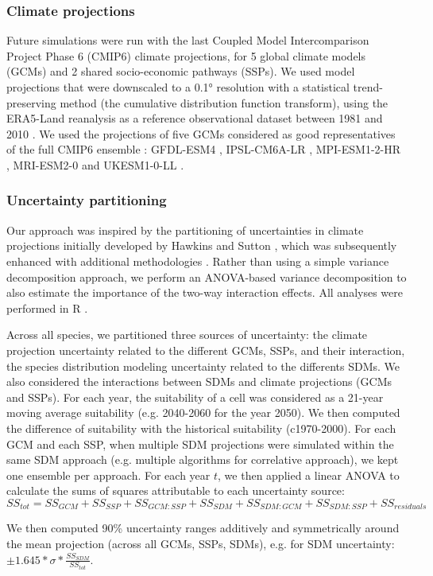 \documentclass[11pt,letter]{article}
\begin{document}
\subsubsection*{Climate projections}

Future simulations were run with the last Coupled Model Intercomparison Project Phase 6 (CMIP6) climate  projections, for 5 global climate models (GCMs) and 2 shared socio-economic pathways (SSPs). 
We used model projections that were downscaled to a 0.1° resolution with a statistical trend-preserving method (the cumulative distribution function transform), using the ERA5-Land reanalysis as a reference observational dataset between 1981 and 2010 \citep{Noel2022}. We used the projections of five GCMs considered as good representatives of the full CMIP6 ensemble \citep{Noel2022} : GFDL-ESM4 \citep{Dunne2020}, IPSL-CM6A-LR \citep{Lurton2020}, MPI-ESM1-2-HR \citep{Mueller2018}, MRI-ESM2-0 \citep{Yukimoto2019} and UKESM1-0-LL \citep{Sellar2020}.  

\subsubsection*{Uncertainty partitioning}

Our approach was inspired by the partitioning of uncertainties in climate projections initially developed by Hawkins and Sutton \citep{Hawkins2009, Hawkins2011}, which was subsequently enhanced with additional methodologies \citep{Yip2011, Lafferty2023}. Rather than using a simple variance decomposition approach, we perform an ANOVA-based variance decomposition to also estimate the importance of the two-way interaction effects. All analyses were performed in R \citep{RCT2024}.

Across all species, we partitioned three sources of uncertainty: the climate projection uncertainty related to the different GCMs, SSPs, and their interaction, the species distribution modeling uncertainty related to the differents SDMs. We also considered the interactions between SDMs and climate projections (GCMs and SSPs). For each year, the suitability of a cell was considered as a 21-year moving average suitability (e.g. 2040-2060 for the year 2050). We then computed the difference of suitability with the historical suitability (c1970-2000). For each GCM and each SSP, when multiple SDM projections were simulated within the same SDM approach (e.g. multiple algorithms for correlative approach), we kept one ensemble per approach. For each year $t$, we then applied a linear ANOVA to calculate the sums of squares attributable to each uncertainty source:
$$
{SS}_{tot} = {SS}_{GCM} + {SS}_{SSP} + {SS}_{GCM:SSP} + {SS}_{SDM} + {SS}_{SDM:GCM} + {SS}_{SDM:SSP} + {SS}_{residuals}
$$

We then computed 90\% uncertainty ranges additively and symmetrically around the mean projection (across all GCMs, SSPs, SDMs), e.g. for SDM uncertainty: $\pm1.645*\sigma*\frac{{SS}_{SDM}}{{SS}_{tot}}$.


\clearpage


\end{document}
